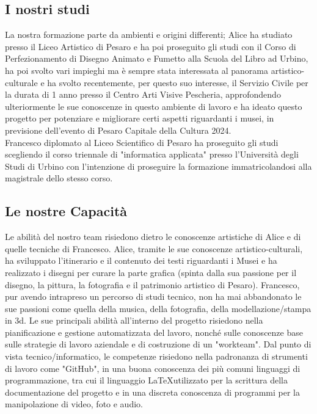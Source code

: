 \documentclass[hidelinks,12pt,a4paper]{article}
\begin{document}
\begin{flushleft}
		\subsection{I nostri studi}
		La nostra formazione parte da ambienti e origini differenti;
		Alice ha studiato presso il Liceo Artistico di Pesaro e ha poi proseguito gli studi con il Corso di Perfezionamento di Disegno Animato e Fumetto alla Scuola del Libro ad Urbino, ha poi svolto vari impieghi ma è sempre stata interessata al panorama artistico-culturale e ha svolto recentemente, per questo suo interesse, il Servizio Civile per la durata di 1 anno presso il Centro Arti Visive Pescheria, approfondendo ulteriormente le sue conoscenze in questo ambiente di lavoro e ha ideato questo progetto per potenziare e migliorare certi aspetti riguardanti i musei, in previsione dell'evento di Pesaro Capitale della Cultura 2024.\\
		Francesco diplomato al Liceo Scientifico di Pesaro ha proseguito gli studi scegliendo il corso triennale di "informatica applicata" presso l'Università degli Studi di Urbino con l'intenzione di proseguire la formazione immatricolandosi alla magistrale dello stesso corso.  
		
		\subsection{Le nostre Capacità}
		Le abilità del nostro team risiedono dietro le conoscenze artistiche di Alice e di quelle tecniche di Francesco. Alice,
		tramite le sue conoscenze artistico-culturali, ha sviluppato l'itinerario e il contenuto dei testi riguardanti i Musei e ha realizzato i disegni per curare la parte grafica (spinta dalla sua passione per il disegno, la pittura, la fotografia e il patrimonio artistico di Pesaro).
		Francesco, pur avendo intrapreso un percorso di studi tecnico, non ha mai abbandonato le sue passioni come quella della musica, della fotografia, della modellazione/stampa in 3d. Le sue principali abilità all'interno del progetto risiedono nella pianificazione e gestione automatizzata del lavoro, nonché sulle conoscenze base sulle strategie di lavoro aziendale e di costruzione di un "workteam". Dal punto di vista tecnico/informatico, le competenze risiedono nella padronanza di strumenti di lavoro come "GitHub", in una buona conoscenza dei più comuni linguaggi di programmazione, tra cui il linguaggio \LaTeX utilizzato per la scrittura della documentazione del progetto e in una discreta conoscenza di programmi per la manipolazione di video, foto e audio.
		

\end{flushleft}
\end{document}
